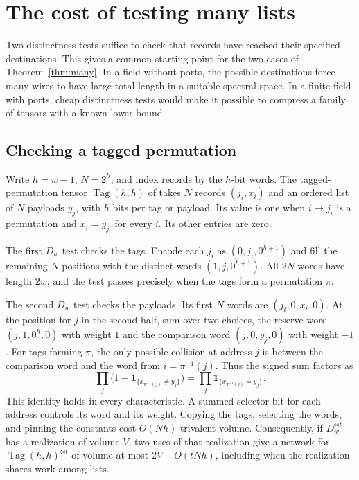 \section{The cost of testing many lists}\label{sec:list}

Two distinctness tests suffice to check that records have reached their
specified destinations. This gives a common starting point for the two
cases of Theorem~\ref{thm:many}. In a field without ports, the possible
destinations force many wires to have large total length in a suitable
spectral space. In a finite field with ports, cheap distinctness tests
would make it possible to compress a family of tensors with a known
lower bound.

\subsection{Checking a tagged permutation}

Write \(h=w-1\), \(N=2^h\), and index records by the \(h\)-bit words.
The tagged-permutation tensor \(\operatorname{Tag}(h,h)\) of
\cite[Definition~]{oaG} takes
\(N\) records \((j_i,x_i)\) and an ordered list of \(N\) payloads
\(y_j\), with \(h\) bits per tag or payload. Its value is one when
\(i\mapsto j_i\) is a permutation and \(x_i=y_{j_i}\) for every \(i\).
Its other entries are zero.

The first \(D_w\) test checks the tags. Encode each \(j_i\) as
\((0,j_i,0^{h+1})\) and fill the remaining \(N\) positions with the
distinct words \((1,j,0^{h+1})\). All \(2N\) words have length \(2w\),
and the test passes precisely when the tags form a permutation \(\pi\).

The second \(D_w\) test checks the payloads. Its first \(N\) words are
\((j_i,0,x_i,0)\). At the position for \(j\) in the second half, sum
over two choices, the reserve word \((j,1,0^h,0)\) with weight \(1\)
and the comparison word \((j,0,y_j,0)\) with weight \(-1\).
For tags forming \(\pi\), the only possible collision at address \(j\)
is between the comparison word and the word from \(i=\pi^{-1}(j)\).
Thus the signed sum factors as
\[
     \prod_j \bigl(1-\mathbf 1_{\{x_{\pi^{-1}(j)}\ne y_j\}}\bigr)
       =\prod_j\mathbf 1_{\{x_{\pi^{-1}(j)}=y_j\}} .
\]
This identity holds in every characteristic. A summed selector bit for
each address controls its word and its weight. Copying the tags,
selecting the words, and pinning the constants cost \(O(Nh)\) trivalent
volume. Consequently, if \(D_w^{\otimes t}\) has a realization of
volume \(V\), two uses of that realization give a network for
\(\operatorname{Tag}(h,h)^{\otimes t}\) of volume at most
\(2V+O(tNh)\), including when the realization shares work among lists.

